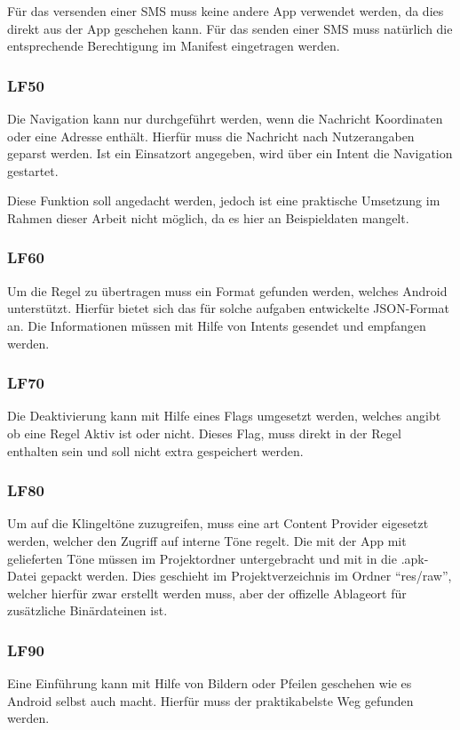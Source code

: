 F\"ur das versenden einer SMS muss keine andere App verwendet werden, da dies direkt aus der App geschehen kann. F\"ur das senden einer SMS muss nat\"urlich die entsprechende Berechtigung im Manifest eingetragen werden.

\subsubsection{LF50}
Die Navigation kann nur durchgef\"uhrt werden, wenn die Nachricht Koordinaten oder eine Adresse enth\"alt. Hierf\"ur muss die Nachricht nach Nutzerangaben geparst werden. Ist ein Einsatzort angegeben, wird \"uber ein Intent die Navigation gestartet.

Diese Funktion soll angedacht werden, jedoch ist eine praktische Umsetzung im Rahmen dieser Arbeit nicht m\"oglich, da es hier an Beispieldaten mangelt.

\subsubsection{LF60}
Um die Regel zu \"ubertragen muss ein Format gefunden werden, welches Android unterst\"utzt. Hierf\"ur bietet sich das f\"ur solche aufgaben entwickelte JSON-Format an. Die Informationen m\"ussen mit Hilfe von Intents gesendet und empfangen werden.

\subsubsection{LF70}
Die Deaktivierung kann mit Hilfe eines Flags umgesetzt werden, welches angibt ob eine Regel Aktiv ist oder nicht. Dieses Flag, muss direkt in der Regel enthalten sein und soll nicht extra gespeichert werden.

\subsubsection{LF80}
Um auf die Klingelt\"one zuzugreifen, muss eine art Content Provider eigesetzt werden, welcher den Zugriff auf interne T\"one regelt. Die mit der App mit gelieferten T\"one m\"ussen im Projektordner untergebracht und mit in die .apk-Datei gepackt werden. Dies geschieht im Projektverzeichnis im Ordner "`res/raw"', welcher hierf\"ur zwar erstellt werden muss, aber der offizelle Ablageort f\"ur zus\"atzliche Bin\"ardateinen ist.

\subsubsection{LF90}
Eine Einf\"uhrung kann mit Hilfe von Bildern oder Pfeilen geschehen wie es Android selbst auch macht. Hierf\"ur muss der praktikabelste Weg gefunden werden. 

